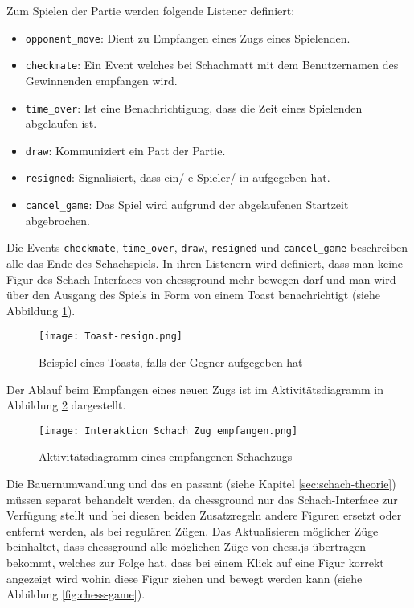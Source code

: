 Zum Spielen der Partie werden folgende Listener definiert:
\begin{itemize}
\item \verb|opponent_move|: Dient zu Empfangen eines Zugs eines Spielenden.
\item \verb|checkmate|: Ein Event welches bei Schachmatt mit dem Benutzernamen des Gewinnenden empfangen wird.
\item \verb|time_over|: Ist eine Benachrichtigung, dass die Zeit eines Spielenden abgelaufen ist.
\item \verb|draw|: Kommuniziert ein Patt der Partie.
\item \verb|resigned|: Signalisiert, dass ein/-e Spieler/-in aufgegeben hat.
\item \verb|cancel_game|: Das Spiel wird aufgrund der abgelaufenen Startzeit abgebrochen.
\end{itemize}
Die Events \verb|checkmate|, \verb|time_over|, \verb|draw|, \verb|resigned| und \verb|cancel_game| beschreiben alle das Ende des Schachspiels. In ihren Listenern wird definiert, dass man keine Figur des Schach Interfaces von chessground mehr bewegen darf und man wird über den Ausgang des Spiels in Form von einem Toast benachrichtigt (siehe Abbildung \ref{fig:resign-toast}).

\begin{figure}[!h]
\centering
\texttt{[image: Toast-resign.png]}
\caption{Beispiel eines Toasts, falls der Gegner aufgegeben hat}
\label{fig:resign-toast}
\end{figure}

Der Ablauf beim Empfangen eines neuen Zugs ist im Aktivitätsdiagramm in Abbildung \ref{fig:chess-opponent-move} dargestellt.


      \begin{figure}[!htb]
      \centering
  \texttt{[image: Interaktion Schach Zug empfangen.png]}
  \caption{Aktivitätsdiagramm eines empfangenen Schachzugs}
  \label{fig:chess-opponent-move}
\end{figure}

 Die Bauernumwandlung und das en passant (siehe Kapitel \ref{sec:schach-theorie}) müssen separat behandelt werden, da chessground nur das Schach-Interface zur Verfügung stellt und bei diesen beiden Zusatzregeln andere Figuren ersetzt oder entfernt werden, als bei regulären Zügen. Das Aktualisieren möglicher Züge beinhaltet, dass chessground alle möglichen Züge von chess.js übertragen bekommt, welches zur Folge hat, dass bei einem Klick auf eine Figur korrekt angezeigt wird wohin diese Figur ziehen und bewegt werden kann (siehe Abbildung \ref{fig:chess-game}).

